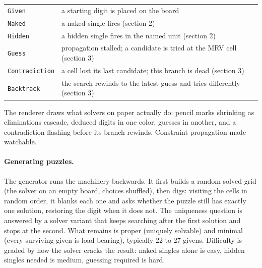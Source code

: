 \documentclass[11pt]{article}
\begin{document}
\begin{center}
\begin{tabular}{ll}
  \texttt{Given} & a starting digit is placed on the board \\
  \texttt{Naked} & a naked single fires (section 2) \\
  \texttt{Hidden} & a hidden single fires in the named unit (section 2) \\
  \texttt{Guess} & propagation stalled; a candidate is tried at the MRV
                   cell (section 3) \\
  \texttt{Contradiction} & a cell lost its last candidate; this branch is
                           dead (section 3) \\
  \texttt{Backtrack} & the search rewinds to the latest guess and tries
                       differently (section 3) \\
\end{tabular}
\end{center}

The renderer draws what solvers on paper actually do: pencil marks
shrinking as eliminations cascade, deduced digits in one color, guesses
in another, and a contradiction flashing before its branch rewinds.
Constraint propagation made watchable.

\paragraph{Generating puzzles.}
The generator runs the machinery backwards. It first builds a random
solved grid (the solver on an empty board, choices shuffled), then digs:
visiting the cells in random order, it blanks each one and asks whether
the puzzle still has exactly one solution, restoring the digit when it
does not. The uniqueness question is answered by a solver variant that
keeps searching after the first solution and stops at the second. What
remains is proper (uniquely solvable) and minimal (every surviving given
is load-bearing), typically 22 to 27 givens. Difficulty is graded by how
the solver cracks the result: naked singles alone is easy, hidden singles
needed is medium, guessing required is hard.
\end{document}
